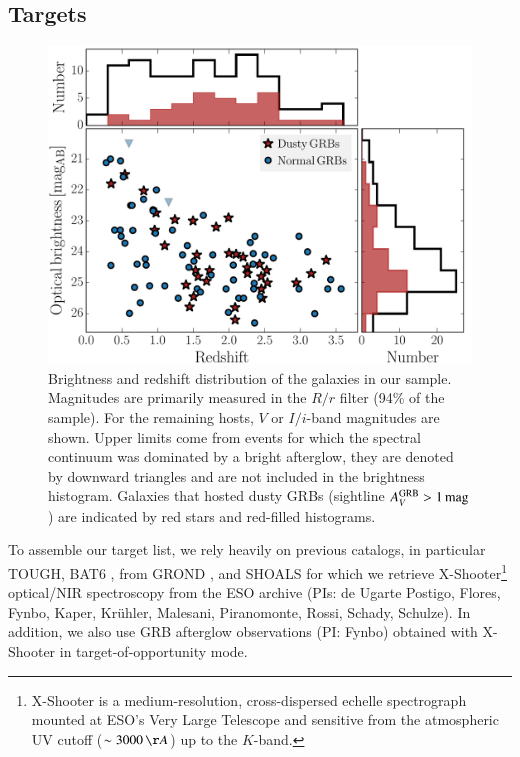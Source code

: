 \documentclass[traditabstract, longauth]{aa}
\begin{document}
\subsection{Targets}
\label{sec:tarob}

\begin{figure}
\includegraphics[angle=0, width=0.99\columnwidth]{Figs/Brightness.pdf}
\caption{Brightness and redshift distribution of the galaxies in our sample. Magnitudes are primarily measured in the $R/r$ filter (94\% of the sample). For the remaining hosts, $V$ or $I/i$-band magnitudes are shown. {Upper limits come from events for which the spectral continuum was dominated by a bright afterglow, they are denoted by downward triangles and are not included in the brightness histogram. Galaxies that hosted dusty GRBs (sightline $A^{\rm{GRB}}_V>1\,\rm{mag}$) are indicated by red stars and red-filled histograms.}}
\label{fig:brightness}
\end{figure}

 {To assemble our target list, we rely heavily on previous catalogs, in particular TOUGH, BAT6 \citep{2012ApJ...749...68S}, from GROND \citep{2011A&A...526A..30G, 2011A&A...534A.108K}, and SHOALS} for which we retrieve X-Shooter\footnote{X-Shooter is a medium-resolution, cross-dispersed echelle spectrograph mounted at ESO's Very Large Telescope and sensitive from the atmospheric UV cutoff ($\sim3000\,\AA$) up to the $K$-band.} \citep{2011A&A...536A.105V} optical/NIR spectroscopy from the ESO archive (PIs: de Ugarte Postigo, Flores, Fynbo, Kaper, Kr\"uhler, Malesani, Piranomonte, Rossi, Schady, Schulze). In addition, we also use GRB afterglow observations (PI: Fynbo) obtained with X-Shooter in target-of-opportunity mode. 
\end{document}
